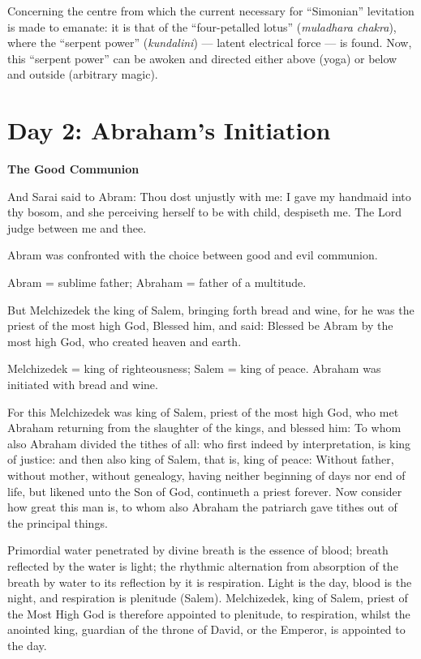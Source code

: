 \begin{quotex}
Concerning the centre from which the current necessary for ``Simonian'' levitation is made to emanate: it is that of the ``four-petalled lotus'' (\emph{muladhara chakra}), where the ``serpent power'' (\emph{kundalini}) — latent electrical force — is found. Now, this ``serpent power'' can be awoken and directed either above (yoga) or below and outside (arbitrary magic). 

\end{quotex}

\section{Day 2: Abraham's Initiation}
\textbf{The Good Communion}

And Sarai said to Abram: Thou dost unjustly with me: I gave my handmaid into thy bosom, and she perceiving herself to be with child, despiseth me. The Lord judge between me and thee. 

Abram was confronted with the choice between good and evil communion.

Abram = sublime father; Abraham = father of a multitude.

But Melchizedek the king of Salem, bringing forth bread and wine, for he was the priest of the most high God, Blessed him, and said: Blessed be Abram by the most high God, who created heaven and earth. 

Melchizedek = king of righteousness; Salem = king of peace. Abraham was initiated with bread and wine.

For this Melchizedek was king of Salem, priest of the most high God, who met Abraham returning from the slaughter of the kings, and blessed him: To whom also Abraham divided the tithes of all: who first indeed by interpretation, is king of justice: and then also king of Salem, that is, king of peace: Without father, without mother, without genealogy, having neither beginning of days nor end of life, but likened unto the Son of God, continueth a priest forever. Now consider how great this man is, to whom also Abraham the patriarch gave tithes out of the principal things. 


\begin{quotex}
Primordial water penetrated by divine breath is the essence of blood; breath reflected by the water is light; the rhythmic alternation from absorption of the breath by water to its reflection by it is respiration. Light is the day, blood is the night, and respiration is plenitude (Salem). Melchizedek, king of Salem, priest of the Most High God is therefore appointed to plenitude, to respiration, whilst the anointed king, guardian of the throne of David, or the Emperor, is appointed to the day.

\end{quotex}

